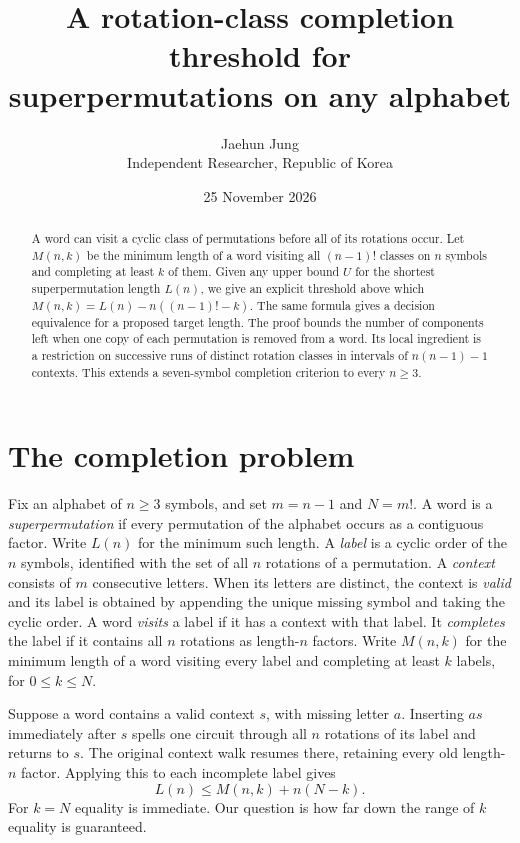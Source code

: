 \documentclass[11pt]{article}
\title{A rotation-class completion threshold for\\superpermutations on any alphabet}
\author{Jaehun Jung\\[3pt]{\small Independent Researcher, Republic of Korea}}
\date{25 November 2026}
\begin{document}
\maketitle
\begin{abstract}
A word can visit a cyclic class of permutations before all of its rotations occur. Let $M(n,k)$ be the minimum length of a word visiting all $(n-1)!$ classes on $n$ symbols and completing at least $k$ of them. Given any upper bound $U$ for the shortest superpermutation length $L(n)$, we give an explicit threshold above which $M(n,k)=L(n)-n((n-1)!-k)$. The same formula gives a decision equivalence for a proposed target length. The proof bounds the number of components left when one copy of each permutation is removed from a word. Its local ingredient is a restriction on successive runs of distinct rotation classes in intervals of $n(n-1)-1$ contexts. This extends a seven-symbol completion criterion to every $n\ge3$.
\end{abstract}

\section{The completion problem}
Fix an alphabet of $n\ge3$ symbols, and set $m=n-1$ and $N=m!$. A word is a \emph{superpermutation} if every permutation of the alphabet occurs as a contiguous factor. Write $L(n)$ for the minimum such length. A \emph{label} is a cyclic order of the $n$ symbols, identified with the set of all $n$ rotations of a permutation. A \emph{context} consists of $m$ consecutive letters. When its letters are distinct, the context is \emph{valid} and its label is obtained by appending the unique missing symbol and taking the cyclic order. A word \emph{visits} a label if it has a context with that label. It \emph{completes} the label if it contains all $n$ rotations as length-$n$ factors. Write $M(n,k)$ for the minimum length of a word visiting every label and completing at least $k$ labels, for $0\le k\le N$.

Suppose a word contains a valid context $s$, with missing letter $a$. Inserting $as$ immediately after $s$ spells one circuit through all $n$ rotations of its label and returns to $s$. The original context walk resumes there, retaining every old length-$n$ factor. Applying this to each incomplete label gives
\begin{equation}
  L(n)\le M(n,k)+n(N-k). \label{eq:splice}
\end{equation}
For $k=N$ equality is immediate. Our question is how far down the range of $k$ equality is guaranteed.
\end{document}
